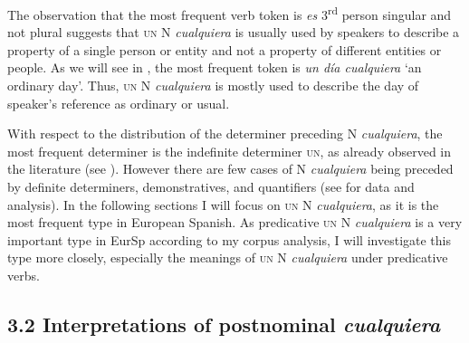 \documentclass[output=paper]{langscibook}
\begin{document}
The observation that the most frequent verb token is \textit{es} 3\textsuperscript{rd} person singular and not plural suggests that \textsc{un} N \textit{cualquiera} is usually used by speakers to describe a property of a single person or entity and not a property of different entities or people. As we will see in , the most frequent token is \textit{un día cualquiera} ‘an ordinary day’. Thus, \textsc{un} N \textit{cualquiera} is mostly used to describe the day of speaker’s reference as ordinary or usual. 

  With respect to the distribution of the determiner preceding N \textit{cualquiera}, the most frequent determiner is the indefinite determiner \textsc{un}, as already observed in the literature (see ). However there are few cases of N \textit{cualquiera} being preceded by definite determiners, demonstratives, and quantifiers (see  for data and analysis). In the following sections I will focus on \textsc{un} N \textit{cualquiera}, as it is the most frequent type in European Spanish. As predicative \textsc{un} N \textit{cualquiera} is a very important type in EurSp according to my corpus analysis, I will investigate this type more closely, especially the meanings of \textsc{un} N \textit{cualquiera} under predicative verbs.

\subsection{\textbf{3.2} \textbf{Interpretations} \textbf{of} \textbf{postnominal} \textbf{\textit{cualquiera}}}
\end{document}
